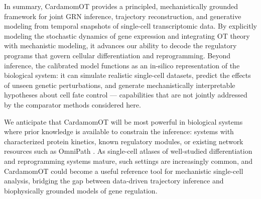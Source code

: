 \documentclass[a4paper, 11pt]{article}
\theoremstyle{plain}
\theoremstyle{remark}
\newcommand*{\firstreview}[1]{{\color{black}#1}}
\begin{document}
In summary, CardamomOT provides a principled, mechanistically grounded framework 
for joint GRN inference, trajectory reconstruction, and generative modeling from 
temporal snapshots of single-cell transcriptomic data. By explicitly modeling the 
stochastic dynamics of gene expression and integrating \firstreview{OT} theory 
with mechanistic modeling, it advances our ability to decode the regulatory programs 
that govern cellular differentiation and reprogramming. Beyond inference, the 
calibrated model functions as \firstreview{an in-silico representation} of the biological system: it can 
simulate realistic single-cell datasets, predict the effects of unseen genetic 
perturbations, and generate mechanistically interpretable hypotheses about cell 
fate control — \firstreview{capabilities that are not jointly addressed by the comparator methods considered here.}

We anticipate that CardamomOT will be most powerful in biological systems where 
prior knowledge is available to constrain the inference: systems with characterized 
protein kinetics, known regulatory modules, or existing network resources such as 
OmniPath \cite{turei2016omnipath}. As single-cell atlases of well-studied differentiation and reprogramming systems mature, such settings are increasingly common, and CardamomOT could become a useful reference tool for mechanistic 
single-cell analysis, bridging the gap between data-driven trajectory inference 
and biophysically grounded models of gene regulation.
\end{document}
